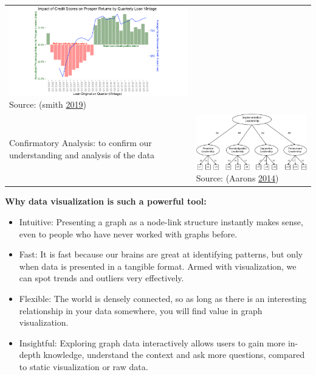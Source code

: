 \documentclass[]{book}
\providecommand{\tightlist}{%
  \setlength{\itemsep}{0pt}\setlength{\parskip}{0pt}}
\begin{document}
\begin{longtable}[]{@{}ll@{}}
\begin{minipage}[t]{0.54\columnwidth}
\includegraphics{images/Exploratory.png} Source: (smith \protect\hyperlink{ref-david_2019}{2019})\strut
\end{minipage}\tabularnewline
\begin{minipage}[t]{0.40\columnwidth}\raggedright
Confirmatory Analysis: to confirm our understanding and analysis of the data\strut
\end{minipage} & \begin{minipage}[t]{0.54\columnwidth}\raggedright
\includegraphics{images/confirmatory.png} Source: (Aarons \protect\hyperlink{ref-aarons_2014}{2014})\strut
\end{minipage}\tabularnewline
\bottomrule
\end{longtable}

\textbf{Why data visualization is such a powerful tool:}

\begin{itemize}
\tightlist
\item
  Intuitive: Presenting a graph as a node-link structure instantly makes sense, even to people who have never worked with graphs before.
\item
  Fast: It is fast because our brains are great at identifying patterns, but only when data is presented in a tangible format. Armed with visualization, we can spot trends and outliers very effectively.
\item
  Flexible: The world is densely connected, so as long as there is an interesting relationship in your data somewhere, you will find value in graph visualization.
\item
  Insightful: Exploring graph data interactively allows users to gain more in-depth knowledge, understand the context and ask more questions, compared to static visualization or raw data.
\end{itemize}
\end{document}

